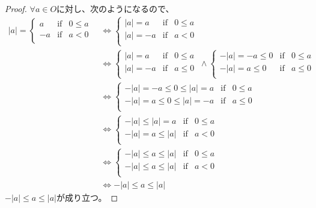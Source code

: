 \documentclass[dvipdfmx]{jsarticle}
\begin{document}
\begin{proof}
$\forall a \in O$に対し、次のようになるので、
\begin{align*}
|a| = \left\{ \begin{matrix}
a & \mathrm{if} & 0 \leq a \\
 - a & \mathrm{if} & a < 0 \\
\end{matrix} \right.\  &\Leftrightarrow \left\{ \begin{matrix}
|a| = a & \mathrm{if} & 0 \leq a \\
|a| = - a & \mathrm{if} & a < 0 \\
\end{matrix} \right.\ \\ 
&\Leftrightarrow \left\{ \begin{matrix}
|a| = a & \mathrm{if} & 0 \leq a \\
|a| = - a & \mathrm{if} & a \leq 0 \\
\end{matrix} \right.\  \land \left\{ \begin{matrix}
 - |a| = - a \leq 0 & \mathrm{if} & 0 \leq a \\
 - |a| = a \leq 0 & \mathrm{if} & a \leq 0 \\
\end{matrix} \right.\ \\ 
&\Leftrightarrow \left\{ \begin{matrix}
 - |a| = - a \leq 0 \leq |a| = a & \mathrm{if} & 0 \leq a \\
 - |a| = a \leq 0 \leq |a| = - a & \mathrm{if} & a \leq 0 \\
\end{matrix} \right.\ \\ 
&\Leftrightarrow \left\{ \begin{matrix}
 - |a| \leq |a| = a & \mathrm{if} & 0 \leq a \\
 - |a| = a \leq |a| & \mathrm{if} & a < 0 \\
\end{matrix} \right.\ \\ 
&\Leftrightarrow \left\{ \begin{matrix}
 - |a| \leq a \leq |a| & \mathrm{if} & 0 \leq a \\
 - |a| \leq a \leq |a| & \mathrm{if} & a < 0 \\
\end{matrix} \right.\ \\ 
&\Leftrightarrow - |a| \leq a \leq |a|
\end{align*}
$- |a| \leq a \leq |a|$が成り立つ。\par

\end{proof}
\end{document}
